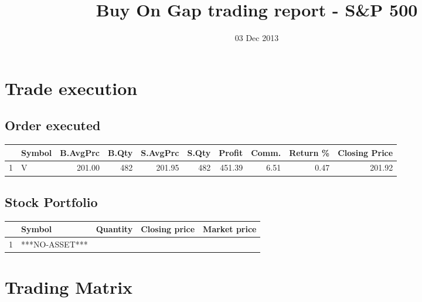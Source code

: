 \documentclass{tufte-handout}\usepackage[]{graphicx}\usepackage[]{color}
\title{Buy On Gap trading report - S\&P 500}
\date{ 03 Dec 2013 }
\begin{document}
\maketitle


\section{Trade execution}
\subsection{Order executed}

\begin{table}[ht]
\centering
\begin{tabular}{llrrrrrrr|r}
  \hline
 & Symbol & B.AvgPrc & B.Qty & S.AvgPrc & S.Qty & Profit & Comm. & Return \% & Closing Price \\ 
  \hline
1 & V & 201.00 & 482 & 201.95 & 482 & 451.39 & 6.51 & 0.47 & 201.92 \\ 
   \hline
\end{tabular}
\end{table}



\subsection{Stock Portfolio}
\begin{table}[ht]
\centering
\begin{tabular}{llrrr}
  \hline
 & Symbol & Quantity & Closing price & Market price \\ 
  \hline
1 & ***NO-ASSET*** &  &  &  \\ 
   \hline
\end{tabular}
\end{table}



\section{Trading Matrix}
\end{document}
